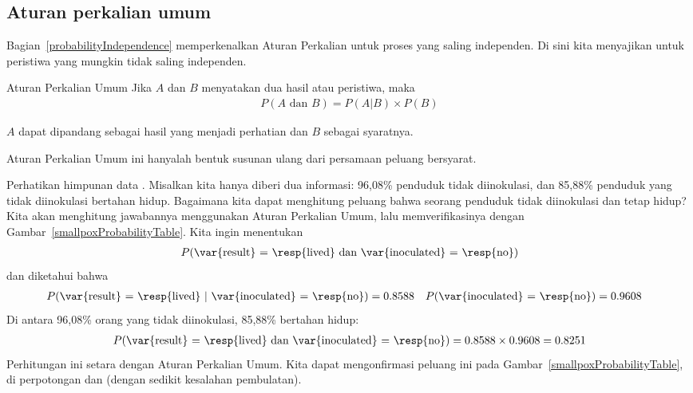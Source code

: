 \subsection{Aturan perkalian umum}

Bagian~\ref{probabilityIndependence} memperkenalkan Aturan Perkalian untuk proses yang saling independen. Di sini kita menyajikan  untuk peristiwa yang mungkin tidak saling independen.

\begin{onebox}{Aturan Perkalian Umum}
Jika $A$ dan $B$ menyatakan dua hasil atau peristiwa, maka \vspace{-1.5mm}
\begin{align*}
P(A\text{ dan }B) = P(A | B)\times P(B)
\end{align*} \vspace{-6.5mm} \par
$A$ dapat dipandang sebagai hasil yang menjadi perhatian dan $B$ sebagai syaratnya.
\end{onebox}

\noindent%
Aturan Perkalian Umum ini hanyalah bentuk susunan ulang dari persamaan peluang bersyarat.


\begin{examplewrap}
\begin{nexample}{Perhatikan himpunan data . Misalkan kita hanya diberi dua informasi: 96,08\% penduduk tidak diinokulasi, dan 85,88\% penduduk yang tidak diinokulasi bertahan hidup. Bagaimana kita dapat menghitung peluang bahwa seorang penduduk tidak diinokulasi dan tetap hidup?}
Kita akan menghitung jawabannya menggunakan Aturan Perkalian Umum, lalu memverifikasinya dengan Gambar~\ref{smallpoxProbabilityTable}. Kita ingin menentukan
\begin{align*}
P(\text{\var{result}
    = \resp{lived} dan \var{inoculated} = \resp{no}})
\end{align*}
dan diketahui bahwa
\begin{align*}
P(\text{\var{result}
    = \resp{lived} }|\text{ \var{inoculated} = \resp{no}})
    &= 0.8588 %
&&P(\text{\var{inoculated} = \resp{no}})
    = 0.9608
\end{align*}
Di antara 96,08\% orang yang tidak diinokulasi, 85,88\% bertahan hidup:
\begin{align*}
P(\text{\var{result} = \resp{lived}
        dan \var{inoculated} = \resp{no}})
    = 0.8588 \times 0.9608
    = 0.8251
\end{align*}
Perhitungan ini setara dengan Aturan Perkalian Umum. Kita dapat mengonfirmasi peluang ini pada Gambar~\ref{smallpoxProbabilityTable}, di perpotongan  dan  (dengan sedikit kesalahan pembulatan).
\end{nexample}
\end{examplewrap}

